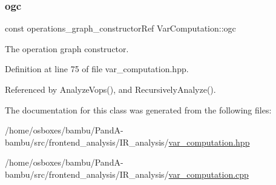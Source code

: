\subsubsection{\texorpdfstring{ogc}{ogc}}
{\footnotesize\ttfamily const operations\+\_\+graph\+\_\+constructor\+Ref Var\+Computation\+::ogc\hspace{0.3cm}{\ttfamily [private]}}



The operation graph constructor. 



Definition at line 75 of file var\+\_\+computation.\+hpp.



Referenced by Analyze\+Vops(), and Recursively\+Analyze().



The documentation for this class was generated from the following files\+:\begin{DoxyCompactItemize}
\item 
/home/osboxes/bambu/\+Pand\+A-\/bambu/src/frontend\+\_\+analysis/\+I\+R\+\_\+analysis/\hyperlink{var__computation_8hpp}{var\+\_\+computation.\+hpp}\item 
/home/osboxes/bambu/\+Pand\+A-\/bambu/src/frontend\+\_\+analysis/\+I\+R\+\_\+analysis/\hyperlink{var__computation_8cpp}{var\+\_\+computation.\+cpp}\end{DoxyCompactItemize}
